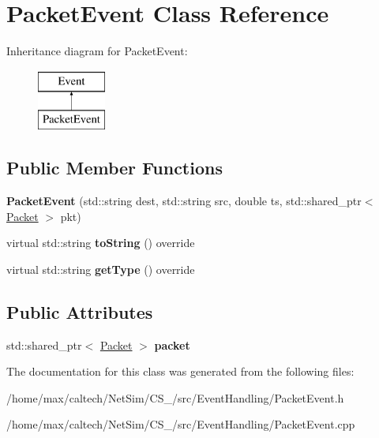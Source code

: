 \hypertarget{classPacketEvent}{\section{\-Packet\-Event \-Class \-Reference}
\label{classPacketEvent}
}
\-Inheritance diagram for \-Packet\-Event\-:\begin{figure}[H]
\begin{center}
\leavevmode
\includegraphics[height=2.000000cm]{classPacketEvent}
\end{center}
\end{figure}
\subsection*{\-Public \-Member \-Functions}
\begin{DoxyCompactItemize}
\item 
\hypertarget{classPacketEvent_a3e70db575746c33aed7bb62b0ad62c85}{{\bfseries \-Packet\-Event} (std\-::string dest, std\-::string src, double ts, std\-::shared\-\_\-ptr$<$ \hyperlink{classPacket}{\-Packet} $>$ pkt)}\label{classPacketEvent_a3e70db575746c33aed7bb62b0ad62c85}

\item 
\hypertarget{classPacketEvent_a4e863687bff18562aed034422393295c}{virtual std\-::string {\bfseries to\-String} () override}\label{classPacketEvent_a4e863687bff18562aed034422393295c}

\item 
\hypertarget{classPacketEvent_a7dfa4c479200db12df64a12bc39d22d8}{virtual std\-::string {\bfseries get\-Type} () override}\label{classPacketEvent_a7dfa4c479200db12df64a12bc39d22d8}

\end{DoxyCompactItemize}
\subsection*{\-Public \-Attributes}
\begin{DoxyCompactItemize}
\item 
\hypertarget{classPacketEvent_ac3390dfb095c14e0b5c078b51dd914cf}{std\-::shared\-\_\-ptr$<$ \hyperlink{classPacket}{\-Packet} $>$ {\bfseries packet}}\label{classPacketEvent_ac3390dfb095c14e0b5c078b51dd914cf}

\end{DoxyCompactItemize}


\-The documentation for this class was generated from the following files\-:\begin{DoxyCompactItemize}
\item 
/home/max/caltech/\-Net\-Sim/\-C\-S\-\_/src/\-Event\-Handling/\-Packet\-Event.\-h\item 
/home/max/caltech/\-Net\-Sim/\-C\-S\-\_/src/\-Event\-Handling/\-Packet\-Event.\-cpp\end{DoxyCompactItemize}
